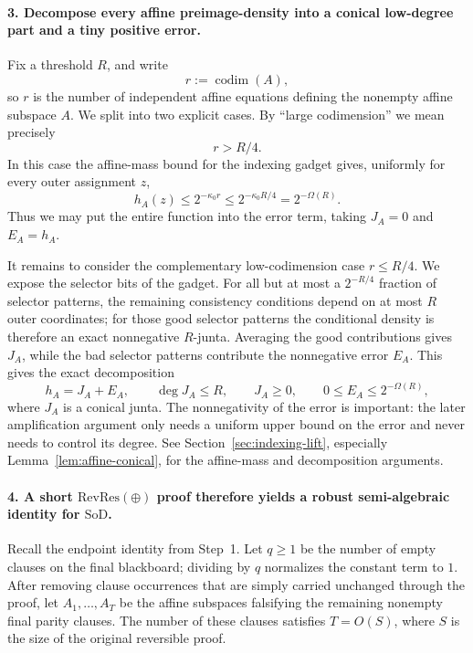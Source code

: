 \documentclass[11pt]{article}
\theoremstyle{definition}
\newcommand{\RevRes}{\mathrm{RevRes}}
\newcommand{\SoD}{\mathrm{SoD}}
\begin{document}
\paragraph{3. Decompose every affine preimage-density into a conical low-degree part
and a tiny positive error.}
Fix a threshold $R$, and write
\[
  r:=\operatorname{codim}(A),
\]
so $r$ is the number of independent affine equations defining the nonempty affine
subspace $A$.  We split into two explicit cases.  By ``large codimension'' we mean
precisely
\[
  r>R/4.
\]
In this case the affine-mass bound for the indexing gadget gives, uniformly for every
outer assignment $z$,
\[
  h_A(z)\le 2^{-\kappa_0 r}
  \le 2^{-\kappa_0R/4}
  =2^{-\Omega(R)}.
\]
Thus we may put the entire function into the error term, taking $J_A=0$ and
$E_A=h_A$.

It remains to consider the complementary low-codimension case $r\le R/4$.  We expose
the selector bits of the gadget.  For all but at most a $2^{-R/4}$ fraction of selector
patterns, the remaining consistency conditions depend on at most $R$ outer coordinates;
for those good selector patterns the conditional density is therefore an exact
nonnegative $R$-junta.  Averaging the good contributions gives $J_A$, while the bad
selector patterns contribute the nonnegative error $E_A$.  This gives the exact
decomposition
\[
  h_A=J_A+E_A,
  \qquad
  \deg J_A\le R,
  \qquad
  J_A\ge0,
  \qquad
  0\le E_A\le 2^{-\Omega(R)},
\]
where $J_A$ is a conical junta.  The nonnegativity of the error is important: the
later amplification argument only needs a uniform upper bound on the error and never
needs to control its degree.  See Section~\ref{sec:indexing-lift}, especially
Lemma~\ref{lem:affine-conical}, for the affine-mass and decomposition arguments.

\paragraph{4. A short $\RevRes(\oplus)$ proof therefore yields a robust
semi-algebraic identity for $\SoD$.}
Recall the endpoint identity from Step~1.  Let $q\ge1$ be the number of empty clauses
on the final blackboard; dividing by $q$ normalizes the constant term to $1$.  After
removing clause occurrences that are simply carried unchanged through the proof, let
$A_1,\ldots,A_T$ be the affine subspaces falsifying the remaining nonempty final
parity clauses.  The number of these clauses satisfies $T=O(S)$, where $S$ is the size
of the original reversible proof.
\end{document}

